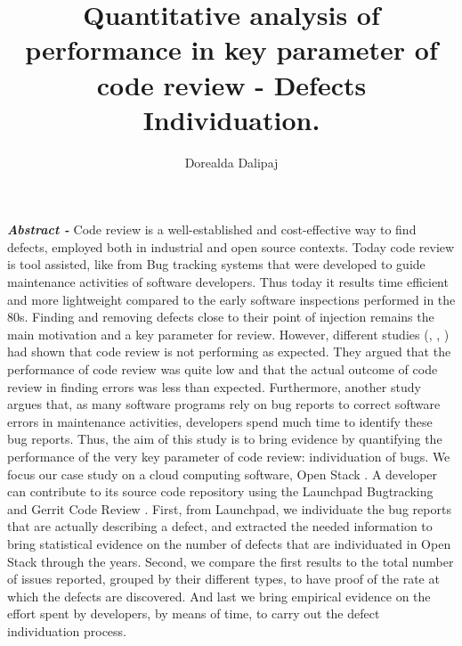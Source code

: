 \documentclass[ifip]{svmult}
\begin{document}
\title*{Quantitative analysis of performance in key parameter of code review - Defects Individuation.}
\author{Dorealda Dalipaj}
%
%
\maketitle

\textbf{\textit{Abstract -}} Code review is a well-established and cost-effective way to find defects, employed both in industrial and open source contexts. 
Today code review is tool assisted, like from Bug tracking systems that were developed to guide maintenance activities of 
software developers. Thus today it results time efficient and more lightweight compared to the early software inspections 
performed in the 80s. Finding and removing defects close to their point of injection remains the main motivation and a key parameter
for review. 
However, different studies (\cite{contribution1}, \cite{contribution9}, \cite{contribution20} ) had shown that code review is not performing as expected. 
They argued that the performance of code review 
was quite low and that the actual outcome of code review in finding errors was less than expected. Furthermore, another study 
\cite{contribution10}
argues that, as many software programs 
rely on bug reports to correct software errors in maintenance activities, developers spend much time to identify these bug reports. 
Thus, the aim of this study is to bring evidence by quantifying the performance of the very key parameter of code review: individuation of bugs.
We focus our case study on a cloud computing software, Open Stack \cite{contribution11}. 
A developer can contribute to its source code repository using the Launchpad Bugtracking \cite{contribution12} and 
Gerrit Code Review \cite{contribution13}. First, from Launchpad, we individuate the bug reports that are actually describing a defect, 
and extracted the needed information to bring statistical evidence on the number of defects that are individuated in Open Stack through the 
years. Second, we compare the first results to the total number of issues reported, grouped by their different types, 
to have proof of the rate at which the defects are discovered. And last we bring empirical evidence on the effort spent by developers, 
by means of time, to carry out the defect individuation process.
\end{document}
